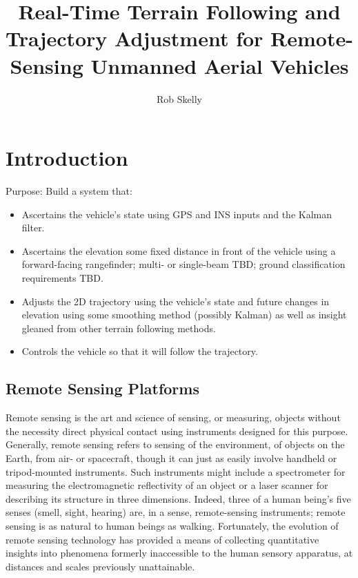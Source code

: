 \documentclass[10pt,a4paper]{report}
\author{Rob Skelly}
\title{Real-Time Terrain Following and Trajectory Adjustment for Remote-Sensing Unmanned Aerial Vehicles}
\begin{document}
\maketitle

\doublespace

\section{Introduction}

Purpose: Build a system that:

\begin{itemize}
\item Ascertains the vehicle's state using GPS and INS inputs and the Kalman filter.
\item Ascertains the elevation some fixed distance in front of the vehicle using a forward-facing rangefinder; multi- or single-beam TBD; ground classification requirements TBD.
\item Adjusts the 2D trajectory using the vehicle's state and future changes in elevation using some smoothing method (possibly Kalman) as well as insight gleaned from other terrain following methods.
\item Controls the vehicle so that it will follow the trajectory.
\end{itemize}

\subsection{Remote Sensing Platforms}

Remote sensing is the art and science of sensing, or measuring, objects without the necessity direct physical contact using instruments designed for this purpose. Generally, remote sensing refers to sensing of the environment, of objects on the Earth, from air- or spacecraft, though it can just as easily involve handheld or tripod-mounted instruments. Such instruments might include a spectrometer for measuring the electromagnetic reflectivity of an object or a laser scanner for describing its structure in three dimensions. Indeed, three of a human being’s five senses (smell, sight, hearing) are, in a sense, remote-sensing instruments; remote sensing is as natural to human beings as walking. Fortunately, the evolution of remote sensing technology has provided a means of collecting quantitative insights into phenomena formerly inaccessible to the human sensory apparatus, at distances and scales previously unattainable.
\end{document}
